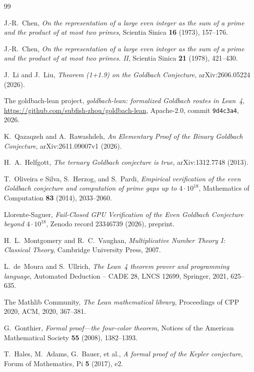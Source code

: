 \documentclass[11pt,a4paper]{ctexart}
\theoremstyle{plain}
\theoremstyle{definition}
\begin{document}
\begin{thebibliography}{99}

J.-R.~Chen,
\emph{On the representation of a large even integer as the sum of a prime and the product of at most two primes},
Scientia Sinica \textbf{16} (1973), 157--176.

J.-R.~Chen,
\emph{On the representation of a large even integer as the sum of a prime and the product of at most two primes. II},
Scientia Sinica \textbf{21} (1978), 421--430.

J.~Li and J.~Liu,
\emph{Theorem (1+1.9) on the Goldbach Conjecture},
arXiv:2606.05224 (2026).

The goldbach-lean project,
\emph{goldbach-lean: formalized Goldbach routes in Lean~4},
\url{https://github.com/subfish-zhou/goldbach-lean}, Apache-2.0, commit \texttt{9d4c3a4}, 2026.

K.~Qazaqzeh and A.~Rawashdeh,
\emph{An Elementary Proof of the Binary Goldbach Conjecture},
arXiv:2611.09007v1 (2026).

H.~A.~Helfgott,
\emph{The ternary Goldbach conjecture is true},
arXiv:1312.7748 (2013).

T.~Oliveira e Silva, S.~Herzog, and S.~Pardi,
\emph{Empirical verification of the even Goldbach conjecture and computation of prime gaps up to $4\cdot10^{18}$},
Mathematics of Computation \textbf{83} (2014), 2033--2060.

Llorente-Saguer,
\emph{Fail-Closed GPU Verification of the Even Goldbach Conjecture beyond $4\cdot10^{18}$},
Zenodo record 23346739 (2026), preprint.

H.~L.~Montgomery and R.~C.~Vaughan,
\emph{Multiplicative Number Theory I: Classical Theory},
Cambridge University Press, 2007.

L.~de~Moura and S.~Ullrich,
\emph{The Lean~4 theorem prover and programming language},
Automated Deduction -- CADE 28, LNCS 12699, Springer, 2021, 625--635.

The Mathlib Community,
\emph{The Lean mathematical library},
Proceedings of CPP 2020, ACM, 2020, 367--381.

G.~Gonthier,
\emph{Formal proof---the four-color theorem},
Notices of the American Mathematical Society \textbf{55} (2008), 1382--1393.

T.~Hales, M.~Adams, G.~Bauer, et al.,
\emph{A formal proof of the Kepler conjecture},
Forum of Mathematics, Pi \textbf{5} (2017), e2.


\end{thebibliography}
\end{document}

